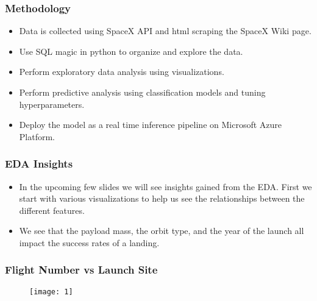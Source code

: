 \documentclass{beamer}
\begin{document}

\begin{frame}

\frametitle{Methodology}

\begin{itemize}

\item Data is collected using SpaceX API and html scraping the SpaceX Wiki page. 

\item Use SQL magic in python to organize and explore the data.

\item Perform exploratory data analysis using visualizations.

\item Perform predictive analysis using classification models and tuning hyperparameters.

\item Deploy the model as a real time inference pipeline on Microsoft Azure Platform.
\end{itemize}

\end{frame}



\begin{frame}

\frametitle{EDA Insights}

\begin{itemize}

\item In the upcoming few slides we will see insights gained from the EDA. First we start with various visualizations to help us see the relationships between the different features.

\item We see that the payload mass, the orbit type, and the year of the launch all impact the success rates of a landing.

\end{itemize}

\end{frame}


\begin{frame}

\frametitle{Flight Number vs Launch Site}

\begin{figure}
\texttt{[image: 1]}
\end{figure}

\end{frame}
\end{document}
